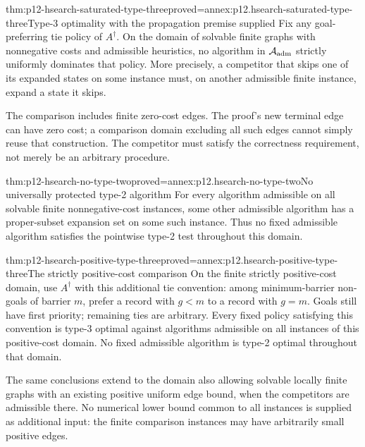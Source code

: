 \begin{hbtheorem}{thm:p12-hsearch-saturated-type-three}{proved=annex:p12.hsearch-saturated-type-three}{Type-3 optimality with the propagation premise supplied}
Fix any goal-preferring tie policy of \(A^\dagger\). On the domain
of solvable finite graphs with nonnegative costs and admissible
heuristics, no algorithm in \(\mathcal A_{\rm adm}\) strictly
uniformly dominates that policy. More precisely, a competitor that
skips one of its expanded states on some instance must, on another
admissible finite instance, expand a state it skips.

The comparison includes finite zero-cost edges. The proof's new terminal
edge can have zero cost; a comparison domain excluding all such edges
cannot simply reuse that construction. The competitor must satisfy the
correctness requirement, not merely be an arbitrary procedure.
\end{hbtheorem}

\begin{hbtheorem}{thm:p12-hsearch-no-type-two}{proved=annex:p12.hsearch-no-type-two}{No universally protected type-2 algorithm}
For every algorithm admissible on all solvable finite nonnegative-cost
instances, some other admissible algorithm has a proper-subset expansion
set on some such instance. Thus no fixed admissible algorithm satisfies
the pointwise type-2 test throughout this domain.
\end{hbtheorem}

\begin{hbtheorem}{thm:p12-hsearch-positive-type-three}{proved=annex:p12.hsearch-positive-type-three}{The strictly positive-cost comparison}
On the finite strictly positive-cost domain, use \(A^\dagger\) with
this additional tie convention: among minimum-barrier non-goals of
barrier \(m\), prefer a record with \(g<m\) to a record with
\(g=m\). Goals still have first priority; remaining ties are arbitrary.
Every fixed policy satisfying this convention is type-3 optimal against
algorithms admissible on all instances of this positive-cost domain.
No fixed admissible algorithm is type-2 optimal throughout that domain.

The same conclusions extend to the domain also allowing solvable locally
finite graphs with an existing positive uniform edge bound, when the
competitors are admissible there. No numerical lower bound common to all
instances is supplied as additional input: the finite comparison
instances may have arbitrarily small positive edges.
\end{hbtheorem}

